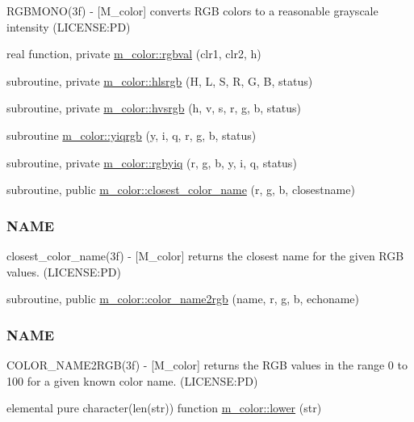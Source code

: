 \begin{DoxyCompactItemize}
\begin{DoxyCompactList}
R\+G\+B\+M\+O\+N\+O(3f) -\/ \mbox{[}M\+\_\+color\mbox{]} converts R\+GB colors to a reasonable grayscale intensity (L\+I\+C\+E\+N\+SE\+:PD) \end{DoxyCompactList}\item 
real function, private \mbox{\hyperlink{namespacem__color_a3e97e24dba7b820f685f13eaa64a6caa}{m\+\_\+color\+::rgbval}} (clr1, clr2, h)
\item 
subroutine, private \mbox{\hyperlink{namespacem__color_a40e6c91da216384eded2157cdaf86eba}{m\+\_\+color\+::hlsrgb}} (H, L, S, R, G, B, status)
\item 
subroutine, private \mbox{\hyperlink{namespacem__color_a334ec90d94bbfb9a4c08c5f9efdb8c47}{m\+\_\+color\+::hvsrgb}} (h, v, s, r, g, b, status)
\item 
subroutine \mbox{\hyperlink{namespacem__color_ac9cd845fb9975144a6deb3a21ce29a29}{m\+\_\+color\+::yiqrgb}} (y, i, q, r, g, b, status)
\item 
subroutine, private \mbox{\hyperlink{namespacem__color_a386d004a1392b7e01ff66f1676d43def}{m\+\_\+color\+::rgbyiq}} (r, g, b, y, i, q, status)
\item 
subroutine, public \mbox{\hyperlink{namespacem__color_acad72628ee0b77cf87f40cd46734fb18}{m\+\_\+color\+::closest\+\_\+color\+\_\+name}} (r, g, b, closestname)
\begin{DoxyCompactList}\small\item\em \subsubsection*{N\+A\+ME}

closest\+\_\+color\+\_\+name(3f) -\/ \mbox{[}M\+\_\+color\mbox{]} returns the closest name for the given R\+GB values. (L\+I\+C\+E\+N\+SE\+:PD) \end{DoxyCompactList}\item 
subroutine, public \mbox{\hyperlink{namespacem__color_a84a36043d278bc56a7148483a862dec8}{m\+\_\+color\+::color\+\_\+name2rgb}} (name, r, g, b, echoname)
\begin{DoxyCompactList}\small\item\em \subsubsection*{N\+A\+ME}

C\+O\+L\+O\+R\+\_\+\+N\+A\+M\+E2\+R\+G\+B(3f) -\/ \mbox{[}M\+\_\+color\mbox{]} returns the R\+GB values in the range 0 to 100 for a given known color name. (L\+I\+C\+E\+N\+SE\+:PD) \end{DoxyCompactList}\item 
elemental pure character(len(str)) function \mbox{\hyperlink{namespacem__color_a704e93b42d777a827ec557c92d2dd7dc}{m\+\_\+color\+::lower}} (str)
\end{DoxyCompactItemize}

